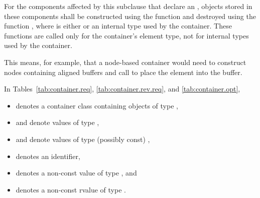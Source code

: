 \pnum
For the components affected by this subclause that declare an ,
objects stored in these components shall be constructed using the function
and destroyed using the function
,
where  is either  or
an internal type used by the container.
These functions are called only for the
container's element type, not for internal types used by the container.
\begin{note}
This
means, for example, that a node-based container would need to construct nodes containing
aligned buffers and call  to place the element into the buffer.
\end{note}

\pnum
In Tables~\ref{tab:container.req},
\ref{tab:container.rev.req}, and
\ref{tab:container.opt},
\begin{itemize}
\item
{} denotes a container class containing objects of type ,
\item
{} and  denote values of type ,
\item
{} and  denote values of type (possibly const) ,
\item
{} denotes an identifier,
\item
{} denotes a non-const value of type , and
\item
{} denotes a non-const rvalue of type .
\end{itemize}

